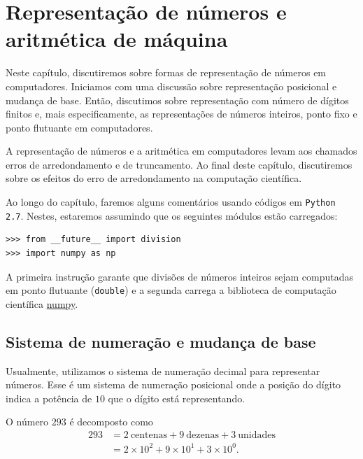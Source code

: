 
%

\chapter{Representação de números e aritmética de máquina}

Neste capítulo, discutiremos sobre formas de representação de números em computadores. Iniciamos com uma discussão sobre representação posicional e mudança de base. Então, discutimos sobre representação com número de dígitos finitos e, mais especificamente, as representações de números inteiros, ponto fixo e ponto flutuante em computadores.

A representação de números e a aritmética em computadores levam aos chamados erros de arredondamento e de truncamento. Ao final deste capítulo, discutiremos sobre os efeitos do erro de arredondamento na computação científica.

\ifispython
Ao longo do capítulo, faremos alguns comentários usando códigos em \verb+Python 2.7+. Nestes, estaremos assumindo que os seguintes módulos estão carregados:
\begin{verbatim}
>>> from __future__ import division
>>> import numpy as np
\end{verbatim}
A primeira instrução garante que divisões de números inteiros sejam computadas em ponto flutuante (\verb+double+) e a segunda carrega a biblioteca de computação científica \href{http://www.numpy.org/}{numpy}.
\fi

\section{Sistema de numeração e mudança de base}
Usualmente, utilizamos o sistema de numeração decimal para representar números. Esse é um sistema de numeração posicional onde a posição do dígito indica a potência de $10$ que o dígito está representando.

\begin{ex}
  O número $293$ é decomposto como
  \begin{equation*}
    \begin{split}
      293 &= 2\ \text{centenas}+9\ \text{dezenas}+3\ \text{unidades}\\
      &= 2\times 10^2+9\times 10^1+3\times 10^0.      
    \end{split}
  \end{equation*}
\end{ex}

